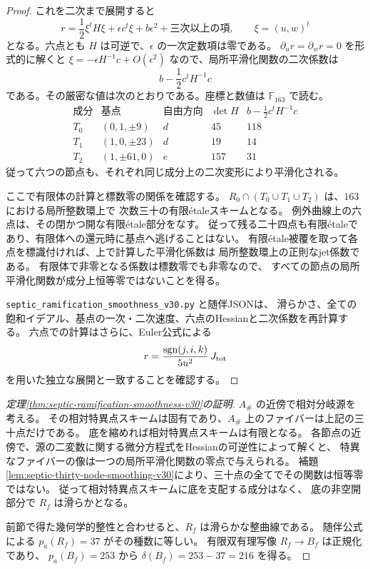 \begin{proof}
これを二次まで展開すると
\[
 r=\frac12\xi^tH\xi+\epsilon c^t\xi+b\epsilon^2+
       \text{三次以上の項},\qquad \xi=(u,w)^t
\]
となる。六点とも $H$ は可逆で、$\epsilon$ の一次定数項は零である。
$\partial_ur=\partial_wr=0$ を形式的に解くと
$\xi=-\epsilon H^{-1}c+O(\epsilon^2)$ なので、局所平滑化関数の二次係数は
\[
 b-\frac12c^tH^{-1}c
\]
である。その厳密な値は次のとおりである。座標と数値は $\mathbb F_{163}$ で読む。
\[
\begin{array}{c|c|c|c|c}
 \text{成分}&\text{基点}&\text{自由方向}&\det H&
 b-\tfrac12c^tH^{-1}c\\\hline
 T_0&(0,1,\pm9)&d&45&118\\
 T_1&(1,0,\pm23)&d&19&14\\
 T_2&(1,\pm61,0)&e&157&31
\end{array}
\]
従って六つの節点も、それぞれ同じ成分上の二次変形により平滑化される。

ここで有限体の計算と標数零の関係を確認する。
$R_0\cap(T_0\cup T_1\cup T_2)$ は、$163$ における局所整数環上で
次数三十の有限\'etaleスキームとなる。
例外曲線上の六点は、その閉かつ開な有限\'etale部分をなす。
従って残る二十四点も有限\'etaleであり、有限体への還元時に基点へ逃げることはない。
有限\'etale被覆を取って各点を標識付ければ、上で計算した平滑化係数は
局所整数環上の正則なjet係数である。
有限体で非零となる係数は標数零でも非零なので、
すべての節点の局所平滑化関数が成分上恒等零ではないことを得る。

\nolinkurl{septic_ramification_smoothness_v30.py} と随伴JSONは、
滑らかさ、全ての飽和イデアル、基点の一次・二次速度、六点のHessianと二次係数を再計算する。
六点での計算はさらに、Euler公式による
\[
 r=\frac{\operatorname{sgn}(j,i,k)}{5u^2}\,J_{\rm tot}
\]
を用いた独立な展開と一致することを確認する。
\end{proof}

\begin{proof}[定理\ref{thm:septic-ramification-smoothness-v30}の証明]
$A_\#$ の近傍で相対分岐源を考える。
その相対特異点スキームは固有であり、$A_\#$ 上のファイバーは上記の三十点だけである。
底を縮めれば相対特異点スキームは有限となる。
各節点の近傍で、源の二変数に関する微分方程式をHessianの可逆性によって解くと、
特異なファイバーの像は一つの局所平滑化関数の零点で与えられる。
補題\ref{lem:septic-thirty-node-smoothing-v30}により、三十点の全てでその関数は恒等零ではない。
従って相対特異点スキームに底を支配する成分はなく、
底の非空開部分で $R_f$ は滑らかとなる。

前節で得た幾何学的整性と合わせると、$R_f$ は滑らかな整曲線である。
随伴公式による $p_a(R_f)=37$ がその種数に等しい。
有限双有理写像 $R_f\to B_f$ は正規化であり、
$p_a(B_f)=253$ から $\delta(B_f)=253-37=216$ を得る。
\end{proof}

